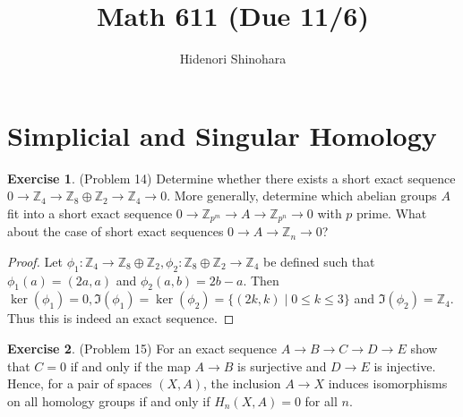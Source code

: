 \documentclass[12pt, psamsfonts]{amsart}
\theoremstyle{definition}
\newtheorem*{exer}{Exercise}
\theoremstyle{remark}
\numberwithin{equation}{section}
\begin{document}
\title{Math 611 (Due 11/6)}
\author{Hidenori Shinohara}
\maketitle

\section{Simplicial and Singular Homology}

\begin{exer}{(Problem 14)}
  Determine whether there exists a short exact sequence $0 \rightarrow \mathbb{Z}_4 \rightarrow \mathbb{Z}_8 \oplus \mathbb{Z}_2 \rightarrow \mathbb{Z}_4 \rightarrow 0$.
  More generally, determine which abelian groups $A$ fit into a short exact sequence $0 \rightarrow \mathbb{Z}_{p^m} \rightarrow A \rightarrow \mathbb{Z}_{p^n} \rightarrow 0$ with $p$ prime.
  What about the case of short exact sequences $0 \rightarrow A \rightarrow \mathbb{Z}_n \rightarrow 0$?
\end{exer}

\begin{proof}
  Let $\phi_1: \mathbb{Z}_4 \rightarrow \mathbb{Z}_8 \oplus \mathbb{Z}_2, \phi_2: \mathbb{Z}_8 \oplus \mathbb{Z}_2 \rightarrow \mathbb{Z}_4$ be defined such that $\phi_1(a) = (2a, a)$ and $\phi_2(a, b) = 2b - a$.
  Then $\ker(\phi_1) = 0, \Im(\phi_1) = \ker(\phi_2) = \{ (2k, k) \mid 0 \leq k \leq 3 \}$ and $\Im(\phi_2) = \mathbb{Z}_4$.
  Thus this is indeed an exact sequence.

\end{proof}

\begin{exer}{(Problem 15)}
  For an exact sequence $A \rightarrow B \rightarrow C \rightarrow D \rightarrow E$ show that $C = 0$ if and only if the map $A \rightarrow B$ is surjective and $D \rightarrow E$ is injective.
  Hence, for a pair of spaces $(X, A)$, the inclusion $A \rightarrow X$ induces isomorphisms on all homology groups if and only if $H_n(X, A) = 0$ for all $n$.
\end{exer}
\end{document}
